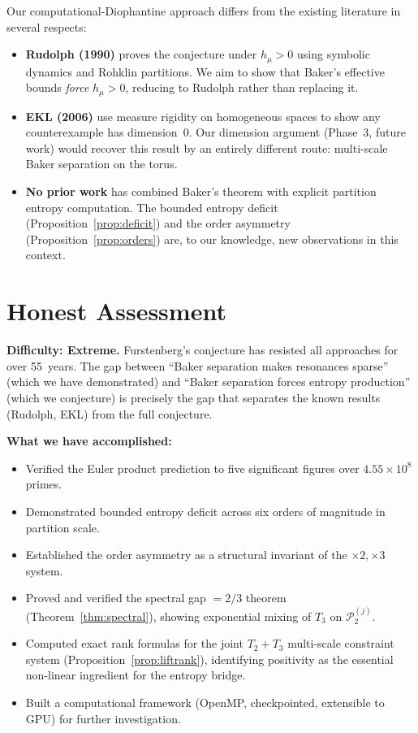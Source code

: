 \documentclass[11pt,a4paper]{article}
\begin{document}
Our computational-Diophantine approach differs from the existing
literature in several respects:

\begin{itemize}
\item \textbf{Rudolph (1990)} proves the conjecture under $h_\mu > 0$
  using symbolic dynamics and Rohklin partitions.
  We aim to show that Baker's effective bounds \emph{force} $h_\mu > 0$,
  reducing to Rudolph rather than replacing it.

\item \textbf{EKL (2006)} use measure rigidity on homogeneous spaces
  to show any counterexample has dimension~0.
  Our dimension argument (Phase~3, future work) would recover this
  result by an entirely different route: multi-scale Baker separation
  on the torus.

\item \textbf{No prior work} has combined Baker's theorem with explicit
  partition entropy computation.
  The bounded entropy deficit (Proposition~\ref{prop:deficit})
  and the order asymmetry (Proposition~\ref{prop:orders}) are,
  to our knowledge, new observations in this context.
\end{itemize}


\section{Honest Assessment}

\textbf{Difficulty: Extreme.}
Furstenberg's conjecture has resisted all approaches for over 55~years.
The gap between ``Baker separation makes resonances sparse''
(which we have demonstrated) and ``Baker separation forces entropy
production'' (which we conjecture) is precisely the gap that
separates the known results (Rudolph, EKL) from the full conjecture.

\textbf{What we have accomplished:}
\begin{itemize}
\item Verified the Euler product prediction to five significant figures
  over $4.55 \times 10^8$ primes.
\item Demonstrated bounded entropy deficit across six orders of magnitude
  in partition scale.
\item Established the order asymmetry as a structural invariant of the
  $\times 2, \times 3$ system.
\item Proved and verified the spectral gap $= 2/3$ theorem
  (Theorem~\ref{thm:spectral}), showing exponential mixing of $T_3$
  on $\mathcal{P}_2^{(j)}$.
\item Computed exact rank formulas for the joint $T_2 + T_3$
  multi-scale constraint system (Proposition~\ref{prop:liftrank}),
  identifying positivity as the essential non-linear ingredient
  for the entropy bridge.
\item Built a computational framework (OpenMP, checkpointed, extensible
  to GPU) for further investigation.
\end{itemize}
\end{document}
